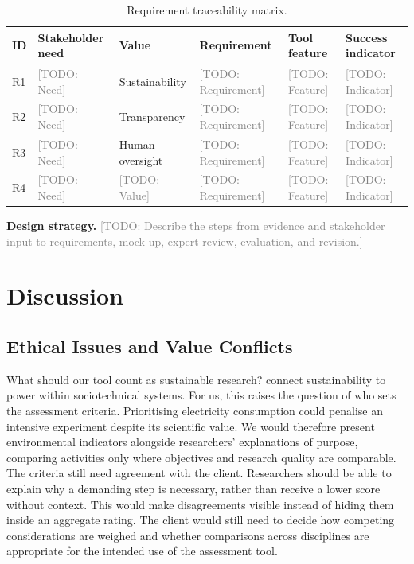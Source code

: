 \documentclass[11pt,a4paper]{article}
\newcommand{\placeholder}[1]{\textcolor{gray}{[TODO: #1]}}
\begin{document}
\begin{table}[htbp]
\centering
\caption{Requirement traceability matrix.}
\scriptsize
\begin{tabularx}{\textwidth}{@{}p{}p{}p{}XXX@{}}
\toprule
ID & Stakeholder need & Value & Requirement & Tool feature & Success indicator \\
\midrule
R1 & \placeholder{Need} & Sustainability & \placeholder{Requirement} & \placeholder{Feature} & \placeholder{Indicator} \\
R2 & \placeholder{Need} & Transparency & \placeholder{Requirement} & \placeholder{Feature} & \placeholder{Indicator} \\
R3 & \placeholder{Need} & Human oversight & \placeholder{Requirement} & \placeholder{Feature} & \placeholder{Indicator} \\
R4 & \placeholder{Need} & \placeholder{Value} & \placeholder{Requirement} & \placeholder{Feature} & \placeholder{Indicator} \\
\bottomrule
\end{tabularx}
\end{table}

\textbf{Design strategy.}
\placeholder{Describe the steps from evidence and stakeholder input to requirements, mock-up, expert review, evaluation, and revision.}

\FloatBarrier
\section{Discussion}

\subsection{Ethical Issues and Value Conflicts}

What should our tool count as sustainable research? \citet{hasselbalch2025sustainability} connect sustainability to power within sociotechnical systems. For us, this raises the question of who sets the assessment criteria. Prioritising electricity consumption could penalise an intensive experiment despite its scientific value. We would therefore present environmental indicators alongside researchers' explanations of purpose, comparing activities only where objectives and research quality are comparable. The criteria still need agreement with the client. Researchers should be able to explain why a demanding step is necessary, rather than receive a lower score without context. This would make disagreements visible instead of hiding them inside an aggregate rating. The client would still need to decide how competing considerations are weighed and whether comparisons across disciplines are appropriate for the intended use of the assessment tool.
\end{document}
